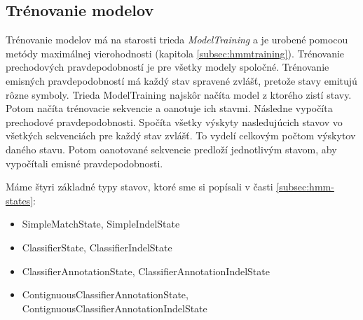 \subsection{Trénovanie modelov}

Trénovanie modelov má na starosti trieda \textit{ModelTraining} a je urobené pomocou metódy maximálnej vierohodnosti (kapitola \ref{subsec:hmmtraining}).
Trénovanie prechodových pravdepodobností je pre všetky modely spoločné. Trénovanie emisných pravdepodobností má každý stav spravené zvlášť, pretože stavy emitujú rôzne symboly.
Trieda ModelTraining najskôr načíta model z ktorého zistí stavy.
Potom načíta trénovacie sekvencie a oanotuje ich stavmi. Následne vypočíta prechodové pravdepodobnosti. Spočíta všetky výskyty nasledujúcich stavov vo všetkých sekvenciách pre každý stav zvlášť. To vydelí celkovým počtom výskytov daného stavu. Potom oanotované sekvencie predloží jednotlivým stavom, aby vypočítali emisné pravdepodobnosti.

Máme štyri základné typy stavov, ktoré sme si popísali v časti \ref{subsec:hmm-states}:
\begin{itemize}
    \item SimpleMatchState, SimpleIndelState
    \item ClassifierState, ClassifierIndelState
    \item ClassifierAnnotationState, ClassifierAnnotationIndelState
    \item ContignuousClassifierAnnotationState, ContignuousClassifierAnnotationIndelState
\end{itemize}

